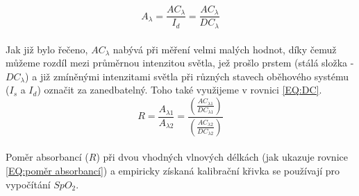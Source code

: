 \begin{equation}
    A_{\lambda} = \frac{AC_{\lambda}}{I_d} = \frac{AC_{\lambda}}{DC_{\lambda}}
    \label{EQ:DC}
\end{equation}\\
Jak již bylo řečeno, $AC_{\lambda}$ nabývá při měření velmi malých hodnot, díky čemuž můžeme rozdíl mezi průměrnou intenzitou světla, jež prošlo prstem (stálá složka - $DC_{\lambda}$) a již zmíněnými intenzitami světla při různých stavech oběhového systému ($I_s$ a $I_d$) označit za zanedbatelný. Toho také využijeme v rovnici \ref{EQ:DC}.\\
\begin{equation}
    R = \frac{A_{\lambda1}}{A_{\lambda2}} = \frac{(\frac{AC_{\lambda1}}{DC_{\lambda1}})}{(\frac{AC_{\lambda2}}{DC_{\lambda2}})}
    \label{EQ:poměr absorbancí}
\end{equation}\\
Poměr absorbancí ($R$) při dvou vhodných vlnových délkách (jak ukazuje rovnice \ref{EQ:poměr absorbancí}) a empiricky získaná kalibrační křivka se používají pro vypočítání $SpO_2$.\\

